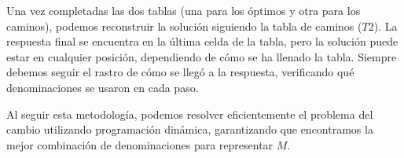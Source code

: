 \documentclass[tikz,11pt,fleqn]{book} %
\begin{document}
Una vez completadas las dos tablas (una para los óptimos y otra para los caminos), podemos reconstruir la solución siguiendo la tabla de caminos ($T2$). La respuesta final se encuentra en la última celda de la tabla, pero la solución puede estar en cualquier posición, dependiendo de cómo se ha llenado la tabla. Siempre debemos seguir el rastro de cómo se llegó a la respuesta, verificando qué denominaciones se usaron en cada paso.

Al seguir esta metodología, podemos resolver eficientemente el problema del cambio utilizando programación dinámica, garantizando que encontramos la mejor combinación de denominaciones para representar $M$.












\end{document}
